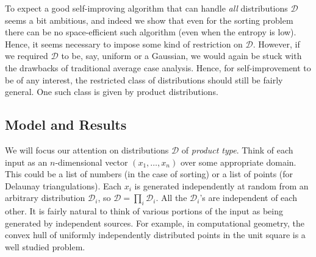 \documentclass{siamltex}
\newcommand{\D}{\mathcal{D}}
\begin{document}
To expect a good self-improving algorithm that can  handle \emph{all}
distributions $\D$ seems a bit ambitious, and indeed we show that
even for the sorting problem there can be no space-efficient such 
algorithm (even when the entropy is low).  Hence, it seems
necessary to impose some kind of restriction on $\D$. However,
if we required $\D$ to be, say, uniform or a Gaussian, we would again
be stuck with the drawbacks of traditional average case analysis.
Hence, for self-improvement to be of any interest, the restricted
class of distributions should still be fairly general. One such class
is given by product distributions. 



\subsection{Model and Results}



We will focus our attention on distributions $\D$ of 
\emph{product type}.
Think of each input as an $n$-dimensional vector $(x_1,\ldots,x_n)$ over
some appropriate domain. This could be a list of numbers (in the case of
sorting) or a list of points (for Delaunay triangulations). Each $x_i$
is generated independently at random from an arbitrary distribution $\D_i$,
so $\D = \prod_i \D_i$.
All the $\D_i$'s are independent of each other. It is fairly natural
to think of various portions of the input as being generated by independent
sources. For example, in computational geometry, the convex hull of uniformly 
independently distributed points in the unit square is a well studied problem.
\end{document}
